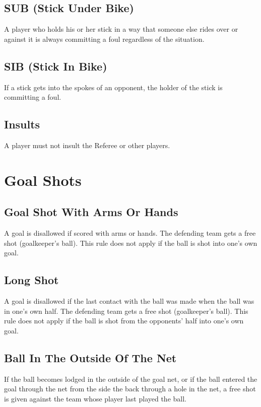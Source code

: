 \subsection{SUB (Stick Under Bike) \label{subsec:hockey_fouls_sub}}
A player who holds his or her stick in a way that someone else rides over or against it is always committing a foul regardless of the situation.

\subsection{SIB (Stick In Bike)}
If a stick gets into the spokes of an opponent, the holder of the stick is committing a foul.

\subsection{Insults}
A player must not insult the Referee or other players.

\section{Goal Shots}

\subsection{Goal Shot With Arms Or Hands \label{subsec:hockey_goal-shots_with-arms-or-hands}}
A goal is disallowed if scored with arms or hands.
The defending team gets a free shot (goalkeeper's ball).
This rule does not apply if the ball is shot into one's own goal.

\subsection{Long Shot}
A goal is disallowed if the last contact with the ball was made when the ball was in one's own half.
The defending team gets a free shot (goalkeeper's ball).
This rule does not apply if the ball is shot from the opponents' half into one's
own goal.

\subsection{Ball In The Outside Of The Net}
If the ball becomes lodged in the outside of the goal net, or if the ball entered the goal through the net from the side the back through a hole in the net, a free shot is given against the team whose player last played the ball.

